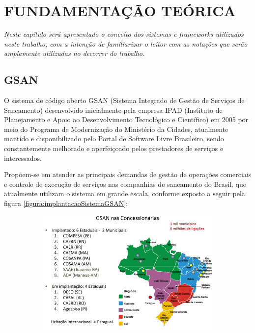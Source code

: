 \chapter[Fundamentação Teórica]{\textbf{\uppercase{Fundamentação Teórica}}}


\textit{Neste capítulo será apresentado o conceito dos sistemas e \textit{frameworks} utilizados neste trabalho, com a intenção de familiarizar o leitor com as notações que serão amplamente utilizadas no decorrer do trabalho.}

\section{\textbf{\uppercase{GSAN}}}
O sistema de código aberto GSAN\label{key:GSAN-TEORIA} (Sistema Integrado de Gestão de Serviços de Saneamento) desenvolvido inicialmente pela empresa IPAD (Instituto de Planejamento e Apoio ao Desenvolvimento Tecnológico e Científico) em 2005 por meio do Programa de Modernização do Ministério da Cidades, atualmente mantido e disponibilizado pelo Portal de Software Livre Brasileiro, sendo constantemente melhorado e aperfeiçoado pelos prestadores de serviços e interessados. 

Propõem-se em atender as principais demandas de gestão de operações comerciais e controle de execução de serviços nas companhias de saneamento do Brasil, que atualmente utilizam o sistema em grande escala, conforme exposto a seguir pela figura \ref{figura:implantacaoSistemaGSAN}:


\begin{figure}[H]
	\centering
	\caption{\textbf{Implantações do Sistema GSAN}}	
	\label{figura:implantacaoSistemaGSAN}
	\begin{subfigure}[H]{\textwidth}
		\centering
		\includegraphics{figuras/implantacaoGSAN.png}
	\end{subfigure}
\end{figure}


